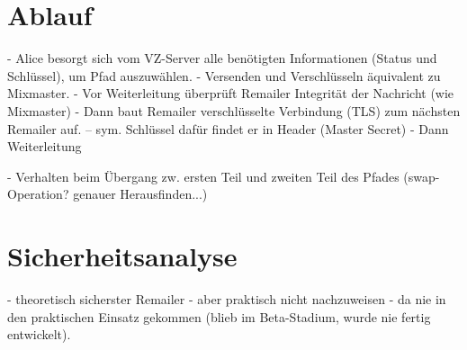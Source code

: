 \section{Ablauf}
- Alice besorgt sich vom VZ-Server alle benötigten Informationen (Status und Schlüssel), um Pfad auszuwählen.
- Versenden und Verschlüsseln äquivalent zu Mixmaster.
- Vor Weiterleitung überprüft Remailer Integrität der Nachricht (wie Mixmaster)
- Dann baut Remailer verschlüsselte Verbindung (TLS) zum nächsten Remailer auf.
-- sym. Schlüssel dafür findet er in Header (Master Secret)
- Dann Weiterleitung

- Verhalten beim Übergang zw. ersten Teil und zweiten Teil des Pfades (swap-Operation? genauer Herausfinden...)


\section{Sicherheitsanalyse}
- theoretisch sicherster Remailer
- aber praktisch nicht nachzuweisen
- da nie in den praktischen Einsatz gekommen (blieb im Beta-Stadium, wurde nie fertig entwickelt).


